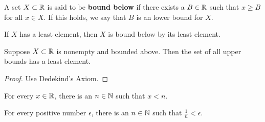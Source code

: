 \begin{definition}
	A set $X \subset \mathbb{R}$ is said to be {\bfseries bound below} if there exists
 	a $B \in \mathbb{R}$ such that $x \geq B$ for all $x \in X$. If this holds, we say
 	that $B$ is an lower bound for $X$.

 	If $X$ has a least element, then $X$ is bound below by its least
 	element.
\end{definition}

\begin{prop}
	Suppose $X \subset \mathbb{R}$ is nonempty and bounded above. Then the set of all 
	upper bounds has a least element.

	\begin{proof}
		Use Dedekind's Axiom.
	\end{proof}
\end{prop}

\begin{corollary}
	For every $x \in \mathbb{R}$, there is an $n \in \mathbb{N}$ such that $x < n$.
\end{corollary}

\begin{corollary}
	For every positive number $\epsilon$, there is an $n \in \mathbb{N}$ such that 
	$\frac{1}{n} < \epsilon$.
\end{corollary}

